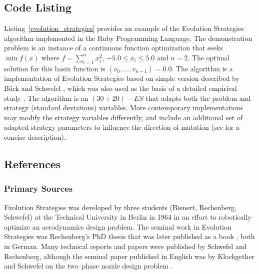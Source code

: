 \subsection{Code Listing}
Listing~\ref{evolution_strategies} provides an example of the Evolution Strategies algorithm implemented in the Ruby Programming Language.
The demonstration problem is an instance of a continuous function optimization that seeks $\min f(x)$ where $f=\sum_{i=1}^n x_{i}^2$, $-5.0\leq x_i \leq 5.0$ and $n=2$. The optimal solution for this basin function is $(v_0,\ldots,v_{n-1})=0.0$.
The algorithm is a implementation of Evolution Strategies based on simple version described by B\"ack and Schwefel \cite{Back1993b}, which was also used as the basis of a detailed empirical study \cite{Yao1997}.
The algorithm is an $(30+20)-ES$ that adapts both the problem and strategy (standard deviations) variables. 
More contemporary implementations may modify the strategy variables differently, and include an additional set of adapted strategy parameters to influence the direction of mutation (see \cite{Rudolph2000} for a concise description).




\subsection{References}

% 
% 
\subsubsection{Primary Sources}
Evolution Strategies was developed by three students (Bienert, Rechenberg, Schwefel) at the Technical University in Berlin in 1964 in an effort to robotically optimize an aerodynamics design problem.
The seminal work in Evolution Strategies was Rechenberg's PhD thesis  \cite{Rechenberg1971} that was later published as a book \cite{Rechenberg1973}, both in German.
Many technical reports and papers were published by Schwefel and Rechenberg, although the seminal paper published in English was by Klockgether and Schwefel on the two--phase nozzle design problem \cite{Klockgether1970}.

